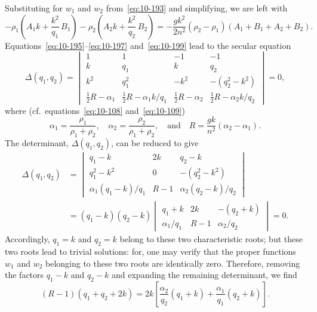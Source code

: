 Substituting for $w_1$ and $w_2$ from~\eqref{eq:10-193} and simplifying, we are left with
\begin{equation}
\label{eq:10-199}
-\rho_1\!\left(A_1k+\frac{k^2}{q_1}\,B_1\right) - \rho_2\!\left(A_2k+\frac{k^2}{q_2}\,B_2\right) = -\frac{gk^2}{2n^2}(\rho_2-\rho_1)(A_1+B_1+A_2+B_2).
\end{equation}
Equations~\eqref{eq:10-195}--\eqref{eq:10-197} and~\eqref{eq:10-199} lead to the secular equation
\begin{equation}
\label{eq:10-200}
\Delta(q_1,q_2) = \begin{vmatrix}
1 & 1 & -1 & -1 \\[3pt]
k & q_1 & k & q_2 \\[3pt]
k^2 & q_1^2 & -k^2 & -(q_2^2-k^2) \\[3pt]
\frac{1}{2}R-\alpha_1 & \frac{1}{2}R-\alpha_1k/q_1 & \frac{1}{2}R-\alpha_2 & \frac{1}{2}R-\alpha_2k/q_2
\end{vmatrix} = 0,
\end{equation}
where (cf.\ equations~\eqref{eq:10-108} and~\eqref{eq:10-109})
\begin{equation}
\label{eq:10-201}
\alpha_1 = \frac{\rho_1}{\rho_1+\rho_2}, \quad \alpha_2 = \frac{\rho_2}{\rho_1+\rho_2}, \quad\text{and}\quad R = \frac{gk}{n^2}(\alpha_2-\alpha_1).
\end{equation}
The determinant, $\Delta(q_1,q_2)$, can be reduced to give
\begin{align}
\label{eq:10-202}
\Delta(q_1,q_2) &= \begin{vmatrix}
q_1-k & 2k & q_2-k \\
q_1^2-k^2 & 0 & -(q_2^2-k^2) \\
\alpha_1(q_1-k)/q_1 & R-1 & \alpha_2(q_2-k)/q_2
\end{vmatrix} \nonumber\\
&= (q_1-k)(q_2-k)\begin{vmatrix}
q_1+k & 2k & -(q_2+k) \\
\alpha_1/q_1 & R-1 & \alpha_2/q_2
\end{vmatrix} = 0.
\end{align}
Accordingly, $q_1 = k$ and $q_2 = k$ belong to these two characteristic roots; but these two roots lead to trivial solutions: for, one may verify that the proper functions $w_1$ and $w_2$ belonging to these two roots are identically zero. Therefore, removing the factors $q_1-k$ and $q_2-k$ and expanding the remaining determinant, we find
\begin{equation}
\label{eq:10-203}
(R-1)(q_1+q_2+2k) = 2k\!\left[\frac{\alpha_2}{q_2}(q_1+k)+\frac{\alpha_1}{q_1}(q_2+k)\right]\!.
\end{equation}
